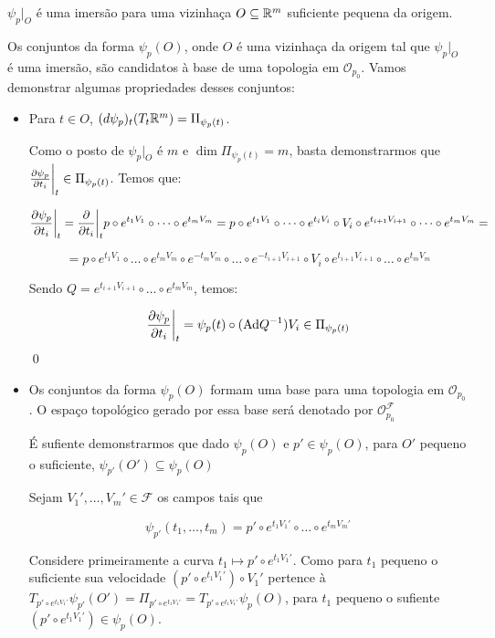 $\psi_p|_O$ é uma imersão para uma vizinhaça $O \subseteq \mathbb{R}^m$ suficiente pequena
da origem.

Os conjuntos da forma $\psi_p(O)$,
onde $O$ é uma vizinhaça da origem tal que
$\psi_p|_O$ é uma imersão, são candidatos
à base de uma topologia em $\mathcal{O}_{p_0}$. Vamos demonstrar
algumas propriedades desses conjuntos:

\begin{itemize}
    \item Para $t \in O$, $(d\psi_p)_t(T_t \mathbb{R}^m) = \Pi_{\psi_p(t)}$.
    
    Como o posto de $\psi_p|_O$ é $m$ e $\dim \Pi_{\psi_p(t)} = m$, basta demonstrarmos
    que $\frac{\partial \psi_p}{\partial t_i}\bigg|_t \in \Pi_{\psi_p(t)}$. Temos que:

    $$\frac{\partial \psi_p}{\partial t_i}\bigg|_t =
    \frac{\partial }{\partial t_i}\bigg|_t p \circ e^{t_1V_1} \circ \dots \circ e^{t_mV_m} =
    p \circ e^{t_1V_1} \circ \dots\circ e^{t_iV_i}\circ V_i \circ e^{t_{i+1}V_{i+1}}\circ 
    \dots \circ e^{t_mV_m}=$$

    $$=p \circ e^{t_1V_1} \circ
    \dots\circ e^{t_mV_m} \circ e^{-t_m V_m}\circ \dots \circ e^{-t_{i+1}V_{i+1}}
    \circ V_i \circ e^{t_{i+1}V_{i+1}}\circ 
    \dots \circ e^{t_mV_m}$$

    Sendo $Q = e^{t_{i+1}V_{i+1}}\circ 
    \dots \circ e^{t_mV_m}$, temos:

    $$\frac{\partial \psi_p}{\partial t_i}\bigg|_t = \psi_p(t) \circ (\text{Ad} Q^{-1})V_i \in \Pi_{\psi_p(t)}$$ \qed

    \item Os conjuntos da forma $\psi_p(O)$ formam uma base para uma topologia
    em $\mathcal{O}_{p_0}$. O espaço topológico gerado por essa base será denotado
    por $\mathcal{O}_{p_0}^\mathcal{F}$
    
    É sufiente demonstrarmos que dado $\psi_p(O)$
    e $p' \in \psi_p(O)$, para $O'$ pequeno o suficiente,
    $\psi_{p'}(O') \subseteq \psi_p(O)$

    Sejam $V_1', \dots, V_m'\in \mathcal{F}$ os campos tais que

    $$\psi_{p'}(t_1,\dots,t_m) = p' \circ e^{t_1V_1'} \circ \dots \circ e^{t_mV_m'}$$

    Considere primeiramente a curva $t_1 \mapsto p' \circ e^{t_1V_1'}$. Como
    para $t_1$ pequeno o suficiente
    sua velocidade $(p' \circ e^{t_1V_1'}) \circ V_1'$ pertence à
    $T_{p' \circ e^{t_1V_1'}} \psi_{p'}(O') =
    \Pi_{p' \circ e^{t_1V_1'}} = T_{p' \circ e^{t_1V_1'}} \psi_{p}(O)$,
    para $t_1$ pequeno o sufiente $(p' \circ e^{t_1V_1'}) \in \psi_{p}(O)$.


\end{itemize}
